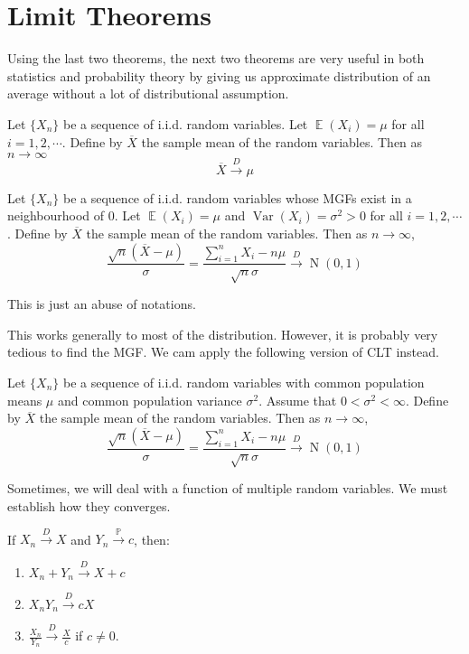 \documentclass{huhtakm-template-book-v2}
\DeclareMathOperator{\prob}{\mathbb{P}}
\DeclareMathOperator{\E}{\mathbb{E}}
\DeclareMathOperator{\Var}{Var}
\DeclareMathOperator{\N}{N}
\begin{document}
\section{Limit Theorems}
Using the last two theorems, the next two theorems are very useful in both statistics and probability theory by giving us approximate distribution of an average without a lot of distributional assumption.
\begin{thm}
	Let $\{X_{n}\}$ be a sequence of i.i.d. random variables. Let $\E(X_{i})=\mu$ for all $i=1,2,\cdots$. Define by $\overline{X}$ the sample mean of the random variables. Then as $n\to\infty$
	\begin{equation*}
		\overline{X}\xrightarrow{D}\mu
	\end{equation*}
\end{thm}
\begin{thm}
	Let $\{X_{n}\}$ be a sequence of i.i.d. random variables whose MGFs exist in a neighbourhood of $0$. Let $\E(X_{i})=\mu$ and $\Var(X_{i})=\sigma^{2}>0$ for all $i=1,2,\cdots$. Define by $\overline{X}$ the sample mean of the random variables. Then as $n\to\infty$,
	\begin{equation*}
		\frac{\sqrt{n}(\overline{X}-\mu)}{\sigma}=\frac{\sum_{i=1}^{n}X_{i}-n\mu}{\sqrt{n}\sigma}\xrightarrow{D}\N(0,1)
	\end{equation*}
\end{thm}
\begin{rem}
	This is just an abuse of notations.
\end{rem}
This works generally to most of the distribution. However, it is probably very tedious to find the MGF. We cam apply the following version of CLT instead.
\begin{thm}
	Let $\{X_{n}\}$ be a sequence of i.i.d. random variables with common population means $\mu$ and common population variance $\sigma^{2}$. Assume that $0<\sigma^{2}<\infty$. Define by $\overline{X}$ the sample mean of the random variables. Then as $n\to\infty$,
	\begin{equation*}
		\frac{\sqrt{n}(\overline{X}-\mu)}{\sigma}=\frac{\sum_{i=1}^{n}X_{i}-n\mu}{\sqrt{n}\sigma}\xrightarrow{D}\N(0,1)
	\end{equation*}
\end{thm}
Sometimes, we will deal with a function of multiple random variables. We must establish how they converges.
\begin{thm}
	If $X_{n}\xrightarrow{D}X$ and $Y_{n}\xrightarrow{\prob}c$, then:
	\begin{enumerate}
		\item $X_{n}+Y_{n}\xrightarrow{D}X+c$
		\item $X_{n}Y_{n}\xrightarrow{D}cX$
		\item $\frac{X_{n}}{Y_{n}}\xrightarrow{D}\frac{X}{c}$ if $c\neq 0$.
	\end{enumerate}
\end{thm}
\end{document}
